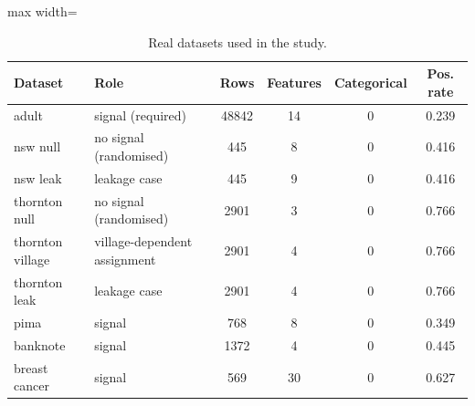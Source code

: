 \begin{table}[!t]
\centering
\caption{Real datasets used in the study.}
\label{tab:datasets}
\footnotesize
\begin{adjustbox}{max width=\linewidth}
\begin{tabular}{llcccc}
\hline
Dataset & Role & Rows & Features & Categorical & Pos. rate \\ \hline
adult & signal (required) & 48842 & 14 & 0 & 0.239 \\
nsw null & no signal (randomised) & 445 & 8 & 0 & 0.416 \\
nsw leak & leakage case & 445 & 9 & 0 & 0.416 \\
thornton null & no signal (randomised) & 2901 & 3 & 0 & 0.766 \\
thornton village & village-dependent assignment & 2901 & 4 & 0 & 0.766 \\
thornton leak & leakage case & 2901 & 4 & 0 & 0.766 \\
pima & signal & 768 & 8 & 0 & 0.349 \\
banknote & signal & 1372 & 4 & 0 & 0.445 \\
breast cancer & signal & 569 & 30 & 0 & 0.627 \\
\hline
\end{tabular}
\end{adjustbox}
\end{table}
